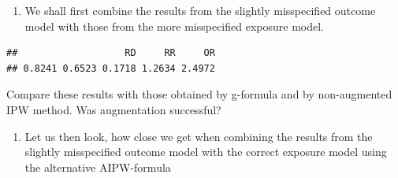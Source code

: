 \documentclass[
]{book}
\newenvironment{Shaded}{\begin{snugshade}}{\end{snugshade}}
\newcommand{\DecValTok}[1]{\textcolor[rgb]{0.00,0.00,0.81}{#1}}
\newcommand{\FunctionTok}[1]{\textcolor[rgb]{0.13,0.29,0.53}{\textbf{#1}}}
\newcommand{\NormalTok}[1]{#1}
\newcommand{\OtherTok}[1]{\textcolor[rgb]{0.56,0.35,0.01}{#1}}
\newcommand{\SpecialCharTok}[1]{\textcolor[rgb]{0.81,0.36,0.00}{\textbf{#1}}}
\providecommand{\tightlist}{%
  \setlength{\itemsep}{0pt}\setlength{\parskip}{0pt}}
\begin{document}
\begin{enumerate}
\def\labelenumi{\arabic{enumi}.}
\tightlist
\item
  We shall first combine the results from the slightly
  misspecified outcome model with those from the more
  misspecified exposure model.
\end{enumerate}

\begin{Shaded}
\end{Shaded}

\begin{verbatim}
##                   RD     RR     OR 
## 0.8241 0.6523 0.1718 1.2634 2.4972
\end{verbatim}

Compare these results with those obtained by g-formula and by
non-augmented IPW method. Was augmentation successful?

\begin{enumerate}
\def\labelenumi{\arabic{enumi}.}
\setcounter{enumi}{1}
\tightlist
\item
  Let us then look, how close we get when combining the results
  from the slightly misspecified outcome model with the correct
  exposure model using the alternative AIPW-formula
\end{enumerate}
\end{document}
